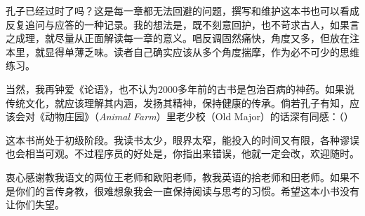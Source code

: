 孔子已经过时了吗？这是每一章都无法回避的问题，撰写和维护这本书也可以看成反复追问与应答的一种记录。我的想法是，既不刻意回护，也不苛求古人，如果言之成理，就尽量从正面解读每一章的意义。唱反调固然痛快，角度又多，但放在注本里，就显得单薄乏味。读者自己确实应该从多个角度揣摩，作为必不可少的思维练习。

当然，我再钟爱《论语》，也不认为2000多年前的古书是包治百病的神药。如果说传统文化，就应该理解其内涵，发扬其精神，保持健康的传承。倘若孔子有知，应该会对《动物庄园》（\emph{Animal Farm}）里老少校（Old Major）的话深有同感：（）

这本书尚处于初级阶段。我读书太少，眼界太窄，能投入的时间又有限，各种谬误也会相当可观。不过程序员的好处是，你指出来错误，他就一定会改，欢迎随时。

衷心感谢教我语文的两位王老师和欧阳老师，教我英语的拾老师和田老师。如果不是你们的言传身教，很难想象我会一直保持阅读与思考的习惯。希望这本小书没有让你们失望。



